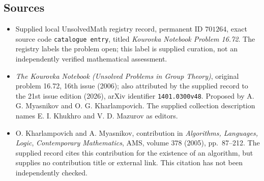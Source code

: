 \documentclass[11pt]{article}
\begin{document}
\subsection{Sources}
\begin{itemize}
\item Supplied local UnsolvedMath registry record, permanent ID \(701264\), exact source code \texttt{catalogue entry}, titled \emph{Kourovka Notebook Problem 16.72}. The registry labels the problem open; this label is supplied curation, not an independently verified mathematical assessment.
\item \emph{The Kourovka Notebook (Unsolved Problems in Group Theory)}, original problem 16.72, 16th issue (2006); also attributed by the supplied record to the 21st issue edition (2026), arXiv identifier \texttt{1401.0300v48}. Proposed by A. G. Myasnikov and O. G. Kharlampovich. The supplied collection description names E. I. Khukhro and V. D. Mazurov as editors.
\item O. Kharlampovich and A. Myasnikov, contribution in \emph{Algorithms, Languages, Logic}, \emph{Contemporary Mathematics}, AMS, volume \(378\) (2005), pp.\ 87--212. The supplied record cites this contribution for the existence of an algorithm, but supplies no contribution title or external link. This citation has not been independently checked.
\end{itemize}
\end{document}

